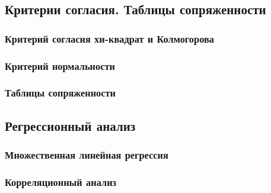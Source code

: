 \subsection{Критерии согласия. Таблицы сопряженности}

\subsubsection{Критерий согласия хи-квадрат и Колмогорова}

\subsubsection{Критерий нормальности}

\subsubsection{Таблицы сопряженности}

\subsection{Регрессионный анализ}

\subsubsection{Множественная линейная регрессия}

\subsubsection{Корреляционный анализ}

\newpage

